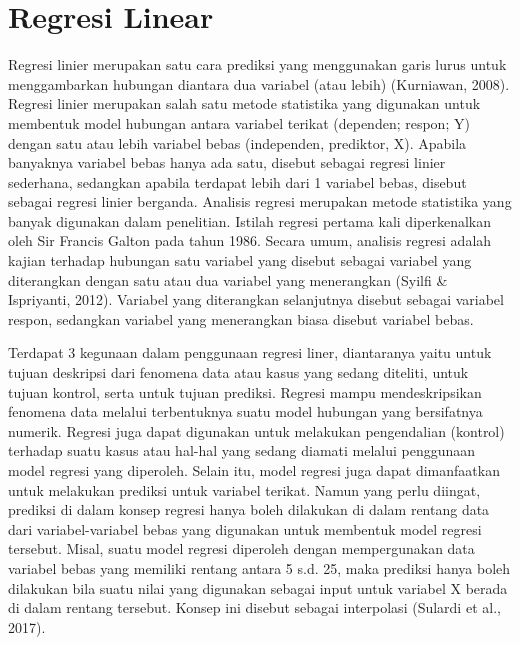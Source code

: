 \section{Regresi Linear}
\label{sec:regresi}




Regresi linier merupakan satu cara prediksi yang menggunakan garis lurus untuk menggambarkan hubungan diantara dua variabel (atau lebih) (Kurniawan, 2008). Regresi linier merupakan salah satu metode statistika yang digunakan untuk membentuk model hubungan antara variabel terikat (dependen; respon; Y) dengan satu atau lebih variabel bebas (independen, prediktor, X).  Apabila banyaknya variabel bebas hanya ada satu, disebut sebagai regresi linier sederhana, sedangkan apabila terdapat lebih dari 1 variabel bebas, disebut sebagai regresi linier berganda. Analisis regresi merupakan metode statistika yang banyak digunakan dalam penelitian. Istilah regresi pertama kali diperkenalkan oleh Sir Francis Galton pada tahun 1986.  Secara umum, analisis regresi adalah kajian terhadap hubungan satu variabel yang disebut sebagai variabel yang diterangkan dengan satu atau dua variabel yang menerangkan (Syilfi \& Ispriyanti, 2012). Variabel yang diterangkan selanjutnya disebut sebagai variabel respon, sedangkan variabel yang menerangkan biasa disebut variabel bebas. 

Terdapat 3 kegunaan dalam penggunaan regresi liner, diantaranya yaitu untuk tujuan deskripsi dari fenomena data atau kasus yang sedang diteliti, untuk tujuan kontrol, serta untuk tujuan prediksi. Regresi mampu mendeskripsikan fenomena data melalui terbentuknya suatu model hubungan yang bersifatnya numerik. Regresi juga dapat digunakan untuk melakukan pengendalian (kontrol) terhadap suatu kasus atau hal-hal yang sedang diamati melalui penggunaan model regresi yang diperoleh. Selain itu, model regresi juga dapat dimanfaatkan untuk melakukan prediksi untuk variabel terikat. Namun yang perlu diingat, prediksi di dalam konsep regresi hanya boleh dilakukan di dalam rentang data dari variabel-variabel bebas yang digunakan untuk membentuk model regresi tersebut. Misal, suatu model regresi diperoleh dengan mempergunakan data variabel bebas yang memiliki rentang antara 5 s.d. 25, maka prediksi hanya boleh dilakukan bila suatu nilai yang digunakan sebagai input untuk variabel X berada di dalam rentang tersebut. Konsep ini disebut sebagai interpolasi (Sulardi et al., 2017).

